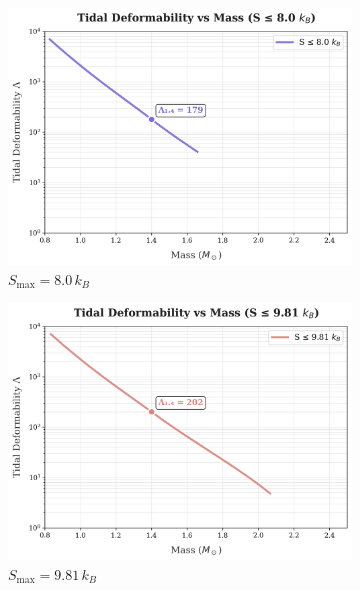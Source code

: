 \documentclass[11pt]{article}
\begin{document}
\begin{figure}[h!]
\centering
\begin{subfigure}[t]{0.32\textwidth}
\includegraphics[width=\textwidth]{lambda_vs_mass_08.00kB.png}
\caption{$S_{\max}=8.0\,k_B$}
\end{subfigure}\hfill
\begin{subfigure}[t]{0.32\textwidth}
\includegraphics[width=\textwidth]{lambda_vs_mass_09.81kB.png}
\caption{$S_{\max}=9.81\,k_B$}
\end{subfigure}\hfill
\begin{subfigure}[t]{0.32\textwidth}

\end{subfigure}
\end{figure}
\end{document}
